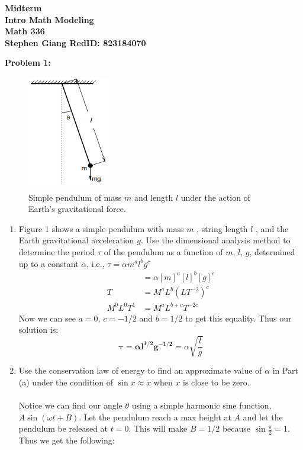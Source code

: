 \documentclass[11pt]{article}
\newcommand{\skipline}{\vspace{\baselineskip}}
\newenvironment{problem}[1]{\textbf{Problem #1: }}{\newpage}
\begin{document}
	
	\begin{center}
		\textbf{Midterm} \\
		\textbf{Intro Math Modeling} \\
		\textbf{Math 336} \\
		\textbf{Stephen Giang RedID: 823184070} \\
		\skipline \skipline
	\end{center}

	\begin{problem}{1}
		\begin{figure}[h!]
			\centering
			\includegraphics[height = 5cm]{Fig1.png}
			\caption{Simple pendulum of mass $m$ and length $l$ under the action of Earth’s gravitational force.}
		\end{figure}
		\begin{enumerate}[label = (\alph*)]
			\item Figure 1 shows a simple pendulum with mass $m$ , string length $l$ , and the Earth gravitational acceleration $g$. Use the dimensional analysis method to determine the period $\tau$ of the pendulum as a function of $m$, $l$, $g$, determined up to a constant $\alpha$, i.e., $\tau = \alpha m^a l^b g^c$
			\begin{align*}
				[\tau] &= \alpha [m]^a [l]^b [g]^c \\
				T &= M^a L^b (LT^{-2})^c \\
				M^0L^0T^1&= M^a L^{b+c} T^{-2c}
			\end{align*}
			Now we can see $a = 0$, $c = -1/2$ and $b = 1/2$ to get this equality.  Thus our solution is:
			\[\boldsymbol{\tau = \alpha l^{1/2} g^{-1/2} } = \alpha\sqrt{\frac{l}{g}}\]
			\newpage
			\item Use the conservation law of energy to find an approximate value of $\alpha$ in Part (a) under the condition
			of $\sin x \approx x$ when $x$ is close to be zero.
			\\ \\
			Notice we can find our angle $\theta$ using a simple harmonic sine function, $A\sin(\omega t + B )$. Let the pendulum reach a max height at $A$ and let the pendulum be released at $t = 0$.  This will make $B = 1 /2$ because $\sin \frac{\pi}{2} = 1$.  Thus we get the following:

\end{enumerate}
\end{problem}
\end{document}
